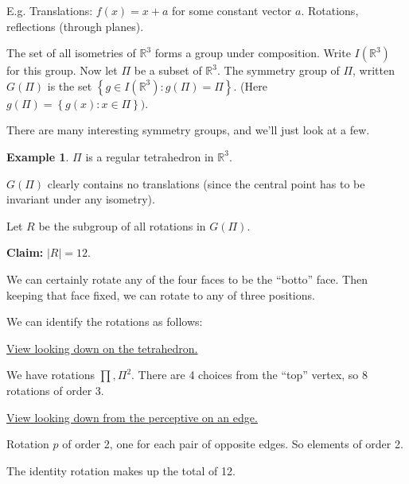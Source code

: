 \documentclass{article}
\theoremstyle{definition}
\newtheorem*{exmp}{Example}
\newcommand{\reals}{\mathbb{R}}
\begin{document}
  E.g. Translations: $f(x)=x+a$ for some constant vector $a$. Rotations, reflections (through planes). 

  The set of all isometries of $\reals^3$ forms a group under composition. Write $I(\reals^3)$ for this group. Now let $\Pi$ be a subset of $\reals^3$. The symmetry group of $\Pi$, written $G(\Pi)$ is the set $\left\{ g \in I(\reals^3):g(\Pi) = \Pi \right\}$. (Here $g(\Pi)=\left\{  g(x):x \in \Pi \right\})$.

  There are many interesting symmetry groups, and we'll just look at a few. 
  \begin{exmp}
    $\Pi$ is a regular tetrahedron in $\reals^3$.

    $G(\Pi)$ clearly contains no translations (since the central point has to be invariant under any isometry).

    Let $R$ be the subgroup of all rotations in $G(\Pi)$.

    \textbf{Claim:} $|R|=12$.

    We can certainly rotate any of the four faces to be the ``botto'' face. Then keeping that face fixed, we can rotate to any of three positions.

    We can identify the rotations as follows:

    \underline{View looking down on the tetrahedron.}


    We have rotations $\prod, \Pi^2$. There are 4 choices from the ``top'' vertex, so 8 rotations of order 3.

    \underline{View looking down from the perceptive on an edge.}


    Rotation $p$ of order 2, one for each pair of opposite edges. So elements of order 2.

    The identity rotation makes up the total of 12.
  \end{exmp}
\end{document}
